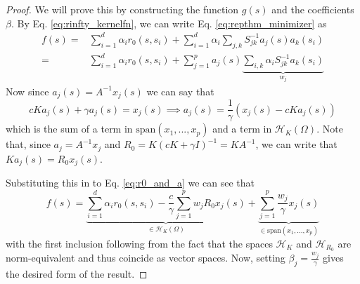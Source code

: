 \documentclass[10pt,a4paper]{amsart}
\newcommand{\SPAN}[1]{\text{span}\left(#1\right)}
\begin{document}
\begin{proof}
    We will prove this by constructing the function $g(s)$ and the coefficients $\beta$. By Eq. \eqref{eq:rinfty_kernelfn}, we can write Eq. \eqref{eq:repthm_minimizer} as
    \begin{equation}\label{eq:r0_and_a}
    \begin{split}
        f(s) =& \sum_{i=1}^d\alpha_ir_0(s,s_i) + \sum_{i=1}^d\alpha_i\sum_{j,k}S^{-1}_{jk}a_j(s)a_k(s_i)\\
        =&\sum_{i=1}^d\alpha_ir_0(s,s_i) + \sum_{j=1}^p a_j(s)\underbrace{\sum_{i,k}\alpha_iS_{jk}^{-1}a_k(s_i)}_{w_j}
        \end{split}
    \end{equation}
    Now since $a_j(s)=A^{-1}x_j(s)$ we can say that 
    \begin{equation}
        cKa_j(s)+\gamma a_j(s) = x_j(s) \implies  a_j(s) = \frac{1}{\gamma}\left(x_j(s)-cKa_j(s)\right)
    \end{equation}
    which is the sum of a term in $\SPAN{x_1,...,x_p}$ and a term in $\mathcal{H}_K(\Omega)$. Note that, since $a_j=A^{-1}x_j$ and $R_0=K(cK+\gamma I)^{-1}=KA^{-1}$, we can write that $Ka_j(s)=R_0x_j(s)$.
    
    Substituting this in to Eq. \eqref{eq:r0_and_a} we can see that
    \begin{equation}
        f(s) = \underbrace{\sum_{i=1}^d\alpha_ir_0(s,s_i) -\frac{c}{\gamma}\sum_{j=1}^pw_jR_0 x_j(s)}_{\in \mathcal{H}_K(\Omega)}+\underbrace{\sum_{j=1}^p \frac{w_j}{\gamma}x_j(s)}_{\in\SPAN{x_1,...,x_p}}
    \end{equation}
    with the first inclusion following from the fact that the spaces $\mathcal{H}_K$ and $\mathcal{H}_{R_0}$ are norm-equivalent and thus coincide as vector spaces. Now, setting $\beta_j=\frac{w_j}{\gamma}$ gives the desired form of the result.
\end{proof}
\end{document}

